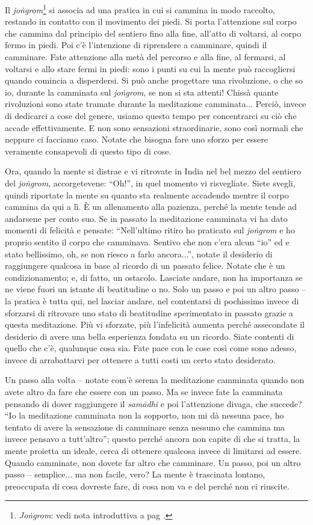 
Il \textit{joṅgrom}\footnote{\textit{Joṅgrom}: vedi nota introduttiva a pag \pageref{jongrom}.} si associa ad una pratica in cui si cammina in
modo raccolto, restando in contatto con il movimento dei piedi. Si porta
l'attenzione sul corpo che cammina dal principio del sentiero fino alla
fine, all'atto di voltarsi, al corpo fermo in piedi. Poi c'è
l'intenzione di riprendere a camminare, quindi il camminare. Fate
attenzione alla metà del percorso e alla fine, al fermarsi, al voltarsi
e allo stare fermi in piedi: sono i punti su cui la mente può
raccogliersi quando comincia a disperdersi. Si può anche progettare una
rivoluzione, o che so io, durante la camminata sul \textit{joṅgrom}, se non si
sta attenti! Chissà quante rivoluzioni sono state tramate durante la
meditazione camminata... Perciò, invece di dedicarci a cose del genere,
usiamo questo tempo per concentrarci su ciò che accade effettivamente. E
non sono sensazioni straordinarie, sono così normali che neppure ci
facciamo caso. Notate che bisogna fare uno sforzo per essere veramente
consapevoli di questo tipo di cose.

Ora, quando la mente si distrae e vi ritrovate in India nel bel mezzo
del sentiero del \textit{joṅgrom}, accorgetevene: ``Oh!'', in quel momento vi
risvegliate. Siete svegli, quindi riportate la mente su quanto sta
realmente accadendo mentre il corpo cammina da qui a lì. È un
allenamento alla pazienza, perché la mente tende ad andarsene per conto
suo. Se in passato la meditazione camminata vi ha dato momenti di
felicità e pensate: ``Nell'ultimo ritiro ho praticato sul \textit{joṅgrom} e ho
proprio sentito il corpo che camminava. Sentivo che non c'era alcun ``io''
ed e stato bellissimo, oh, se non riesco a farlo ancora...'', notate il
desiderio di raggiungere qualcosa in base al ricordo di un passato
felice. Notate che è un condizionamento; e, di fatto, un ostacolo.
Lasciate andare, non ha importanza se ne viene fuori un istante di
beatitudine o no. Solo un passo e poi un altro passo – la pratica è
tutta qui, nel lasciar andare, nel contentarsi di pochissimo invece di
sforzarsi di ritrovare uno stato di beatitudine sperimentato in passato
grazie a questa meditazione. Più vi sforzate, più l'infelicità aumenta
perché assecondate il desiderio di avere una bella esperienza fondata su
un ricordo. Siate contenti di quello che c'è, qualunque cosa sia. Fate
pace con le cose così come sono adesso, invece di arrabattarvi per
ottenere a tutti costi un certo stato desiderato.

Un passo alla volta – notate com'è serena la meditazione camminata
quando non avete altro da fare che essere con un passo. Ma se invece
fate la camminata pensando di dover raggiungere il \textit{samādhi} e poi
l'attenzione divaga, che succede? ``Io la meditazione camminata non la
sopporto, non mi dà nessuna pace, ho tentato di avere la sensazione di
camminare senza nessuno che cammina ma invece pensavo a tutt'altro'';
questo perché ancora non capite di che si tratta, la mente proietta un
ideale, cerca di ottenere qualcosa invece di limitarsi ad essere. Quando
camminate, non dovete far altro che camminare. Un passo, poi un altro
passo – semplice... ma non facile, vero? La mente è trascinata lontano,
preoccupata di cosa dovreste fare, di cosa non va e del perché non ci
riuscite.


